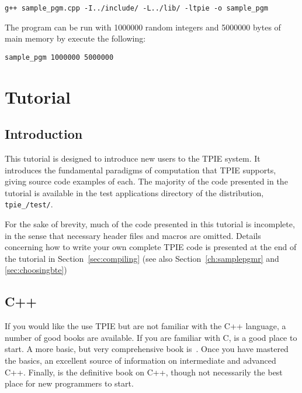 \begin{verbatim}
g++ sample_pgm.cpp -I../include/ -L../lib/ -ltpie -o sample_pgm
\end{verbatim}

The program can be run with 1000000 random integers and 5000000 bytes of main
memory by execute the following:
\begin{verbatim}
sample_pgm 1000000 5000000
\end{verbatim}


\chapter{Tutorial}
\label{ch:tutorial}

\section{Introduction}

This tutorial is designed to introduce new users to the TPIE system.
It introduces the fundamental paradigms of computation that TPIE
supports, giving source code examples of each.  The majority of the
code presented in the tutorial is available in the test
applications directory of the distribution, 
{\tt tpie\_\version/test/}.

For the sake of brevity, much of the code presented in this tutorial is
incomplete, in the sense that necessary header files 
and macros are omitted. Details concerning how to write your
own complete TPIE code is presented at the end of the tutorial in
Section~\ref{sec:compiling} (see also Section~\ref{ch:samplepgmr} and
\ref{sec:choosingbte})



\section{C++}

If you would like the use TPIE but are not familiar with the C++
language, a number of good books are available. If you are familiar with
C, \cite{pohl:c++} is a good place to start. A more basic, but
very comprehensive book is~\cite{deitel:c++}. Once you have mastered the
basics, \cite{meyers:effective} an excellent source of information on
intermediate and advanced C++.  Finally, \cite{ellis:arm} is the definitive
book on C++, though not necessarily the best place for new programmers to
start.

